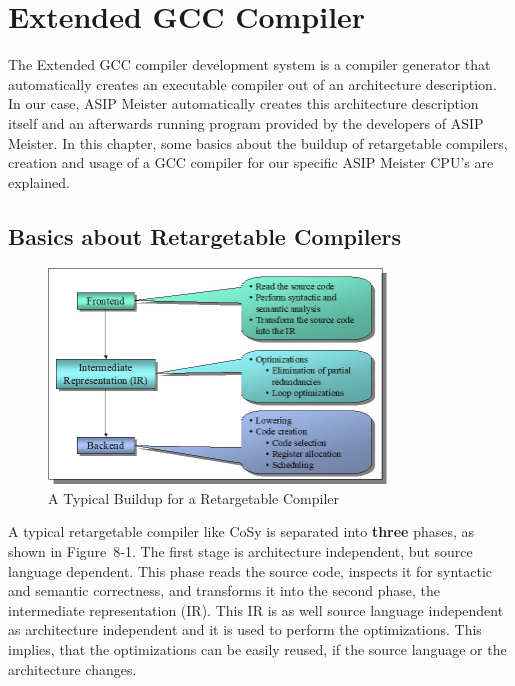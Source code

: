 \hypertarget{extended-gcc-compiler}{%
\chapter{Extended GCC Compiler}\label{extended-gcc-compiler}}

The Extended GCC compiler development system is a compiler generator
that automatically creates an executable compiler out of an architecture
description. In our case, ASIP Meister automatically creates this
architecture description itself and an afterwards running program
provided by the developers of ASIP Meister. In this chapter, some basics
about the buildup of retargetable compilers, creation and usage of a GCC
compiler for our specific ASIP Meister CPU's are explained.

\hypertarget{basics-about-retargetable-compilers}{%
\section{Basics about Retargetable
Compilers}\label{basics-about-retargetable-compilers}}
\begin{figure}[!htb]
	\centering
	\includegraphics[width=0.8\textwidth]{src/images/8-1.png}
	\caption{A Typical Buildup for a Retargetable Compiler}
	\label{fig:fig81}
\end{figure}
A typical retargetable compiler like CoSy \cite{CoSy} is separated into \textbf{three} phases,
as shown in Figure~8‑1. The first stage is architecture independent, but
source language dependent. This phase reads the source code, inspects it
for syntactic and semantic correctness, and transforms it into the
second phase, the intermediate representation (IR). This IR is as well
source language independent as architecture independent and it is used
to perform the optimizations. This implies, that the optimizations can
be easily reused, if the source language or the architecture changes.
